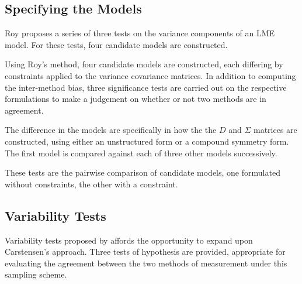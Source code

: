 \documentclass[12pt, a4paper]{report}
\theoremstyle{plain}
\theoremstyle{definition}
\theoremstyle{remark}
\begin{document}
			
			
			
			\subsection{Specifying the Models}
			Roy proposes a series of three tests on the variance components of an LME model. For these tests, four candidate models are constructed. 
			
			Using Roy's method, four candidate models are constructed, each differing by constraints applied to the variance covariance matrices. In addition to computing the inter-method bias, three significance tests are carried out on the respective formulations to make a judgement on whether or not two methods are in agreement.
			
			
			The difference in the models are specifically in how the the $D$ and $\Sigma$ matrices are constructed, using either an unstructured form or a compound symmetry form. The first model is compared against each of three other models successively.
			
			
			
			
			These tests are the pairwise comparison of candidate models, one formulated without constraints, the other with a constraint.
			
			
			
			
			
			
			
			\subsection{Variability Tests}
			
			
			
			
			
			Variability tests proposed by \citet{ARoy2009} affords the opportunity to expand upon Carstensen's approach. Three tests of hypothesis are provided, appropriate for evaluating the agreement between the two methods of measurement under this sampling scheme. 
			
			
			
			
			
			
			
			
			
			
			
			
			
			
			
			
			
			
			
			
\end{document}
